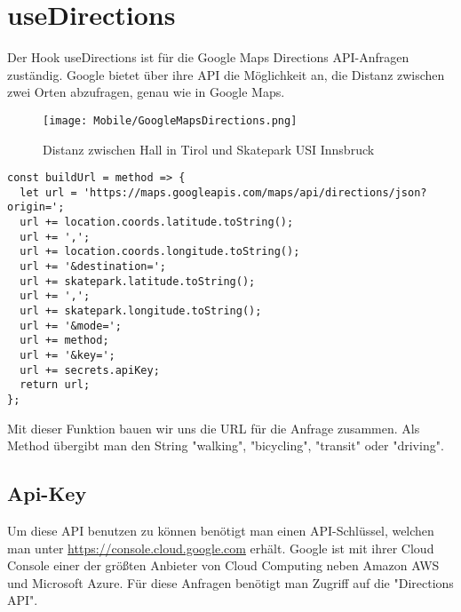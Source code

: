 \section{useDirections}
Der Hook useDirections ist für die Google Maps Directions API-Anfragen zuständig. Google bietet über
ihre API die Möglichkeit an, die Distanz zwischen zwei Orten abzufragen, genau wie in Google Maps.

\begin{figure}[H]
  \begin{center}
    \texttt{[image: Mobile/GoogleMapsDirections.png]}
    \caption{Distanz zwischen Hall in Tirol und Skatepark USI Innsbruck}
  \end{center}
\end{figure}

\begin{lstlisting}
const buildUrl = method => {
  let url = 'https://maps.googleapis.com/maps/api/directions/json?origin=';
  url += location.coords.latitude.toString();
  url += ',';
  url += location.coords.longitude.toString();
  url += '&destination=';
  url += skatepark.latitude.toString();
  url += ',';
  url += skatepark.longitude.toString();
  url += '&mode=';
  url += method;
  url += '&key=';
  url += secrets.apiKey;
  return url;
};
\end{lstlisting}

Mit dieser Funktion bauen wir uns die URL für die Anfrage zusammen. Als Method übergibt man den
String "walking", "bicycling", "transit" oder "driving".

\subsection{Api-Key}
\label{apikey}
Um diese API benutzen zu können benötigt man einen API-Schlüssel, welchen man unter
\url{https://console.cloud.google.com} erhält. Google ist mit ihrer Cloud Console einer der größten
Anbieter von Cloud Computing neben Amazon AWS und Microsoft Azure. Für diese Anfragen benötigt man
Zugriff auf die "Directions API".
